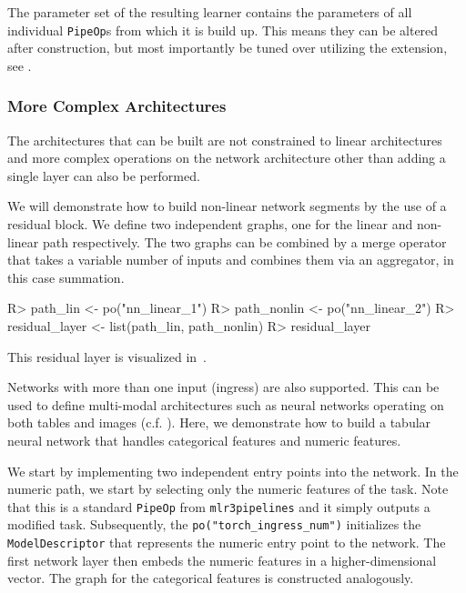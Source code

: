 \documentclass[article, nojss]{jss}
\theoremstyle{definition}
\begin{document}
The parameter set of the resulting learner contains the parameters of all individual \texttt{PipeOp}s from which it is build up.
This means they can be altered after construction, but most importantly be tuned over utilizing the  extension, see .

\subsubsection{More Complex Architectures}\label{sec:complex-architectures}

The architectures that can be built are not constrained to linear architectures and more complex operations on the network architecture other than adding a single layer can also be performed.

We will demonstrate how to build non-linear network segments by the use of a residual block.
We define two independent graphs, one for the linear and non-linear path respectively.
The two graphs can be combined by a merge operator that takes a variable number of inputs and combines them via an aggregator, in this case summation.

\begin{CodeInput}
R> path_lin <- po("nn_linear_1")
R> path_nonlin <- po("nn_linear_2") %
R> residual_layer <- list(path_lin, path_nonlin) %
R> residual_layer
\end{CodeInput}

This residual layer is visualized in~.

Networks with more than one input (ingress) are also supported.
This can be used to define multi-modal architectures such as neural networks operating on both tables and images (c.f. ).
Here, we demonstrate how to build a tabular neural network that handles categorical features and numeric features.

We start by implementing two independent entry points into the network.
In the numeric path, we start by selecting only the numeric features of the task.
Note that this is a standard \texttt{PipeOp} from \texttt{mlr3pipelines} and it simply outputs a modified task.
Subsequently, the \texttt{po("torch\_ingress\_num")} initializes the \texttt{ModelDescriptor} that represents the numeric entry point to the network.
The first network layer then embeds the numeric features in a higher-dimensional vector.
The graph for the categorical features is constructed analogously.
\end{document}
